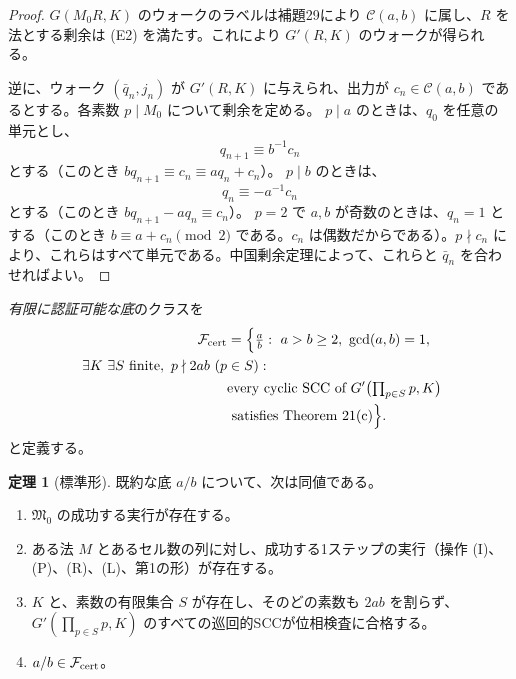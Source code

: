 \documentclass[11pt,reqno]{amsart}
\theoremstyle{definition}
\newtheorem{theorem}{定理}
\theoremstyle{definition}
\theoremstyle{remark}
\begin{document}
\begin{proof}\leavevmode\label{proof:36}
\(G(M_0R,K)\) のウォークのラベルは補題29により \(\mathcal C(a,b)\) に属し、\(R\) を法とする剰余は (E2) を満たす。これにより \(G'(R,K)\) のウォークが得られる。

逆に、ウォーク \((\bar q_n,j_n)\) が \(G'(R,K)\) に与えられ、出力が \(c_n\in\mathcal C(a,b)\) であるとする。各素数 \(p\mid M_0\) について剰余を定める。
\(p\mid a\) のときは、\(q_0\) を任意の単元とし、
\[
q_{n+1}\equiv b^{-1}c_n
\]
とする（このとき \(bq_{n+1}\equiv c_n\equiv aq_n+c_n\)）。
\(p\mid b\) のときは、
\[
q_n\equiv-a^{-1}c_n
\]
とする（このとき \(bq_{n+1}-aq_n\equiv c_n\)）。
\(p=2\) で \(a,b\) が奇数のときは、\(q_n=1\) とする（このとき \(b\equiv a+c_n\pmod2\) である。\(c_n\) は偶数だからである）。\(p\nmid c_n\) により、これらはすべて単元である。中国剰余定理によって、これらと \(\bar q_n\) を合わせればよい。\qedhere
\end{proof}

\emph{有限に認証可能な底}のクラスを
\[
\begin{aligned}
\mathcal F_{\rm cert}&=\Bigl\{\tfrac ab:\ a>b\ge2,\ \gcd(a,b)=1,\\\
\exists K\ \exists S\text{ finite},\ p\nmid2ab\ (p&\in S):\\\
&\text{every cyclic SCC of }G'\bigl(\textstyle\prod_{p\in S}p,K\bigr)\\
&\text{ satisfies Theorem 21(c)}\Bigr\}.
\end{aligned}
\]
と定義する。

\begin{samepage}
\begin{theorem}[標準形]\leavevmode\label{thm:37}
既約な底 \(a/b\) について、次は同値である。

\begin{enumerate}
\def\labelenumi{(\arabic{enumi})}
\item
  \(\mathfrak M_0\) の成功する実行が存在する。
\item
  ある法 \(M\) とあるセル数の列に対し、成功する1ステップの実行（操作 (I)、(P)、(R)、(L)、第1の形）が存在する。
\item
  \(K\) と、素数の有限集合 \(S\) が存在し、そのどの素数も \(2ab\) を割らず、\(G'(\prod_{p\in S}p,K)\) のすべての巡回的SCCが位相検査に合格する。
\item
  \(a/b\in\mathcal F_{\rm cert}\)。
\end{enumerate}
\label{thm-end:37}
\end{theorem}
\end{samepage}
\end{document}

